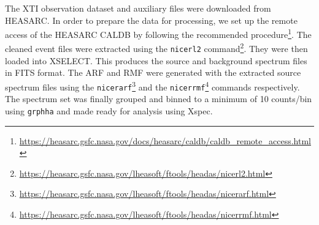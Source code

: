     	The XTI observation dataset and auxiliary files were downloaded from HEASARC. In order to prepare the data for processing, we set up the remote access of the HEASARC CALDB by following the recommended procedure\footnote{\url{https://heasarc.gsfc.nasa.gov/docs/heasarc/caldb/caldb_remote_access.html}}. The cleaned event files were extracted using the \texttt{nicerl2} command\footnote{\url{https://heasarc.gsfc.nasa.gov/lheasoft/ftools/headas/nicerl2.html}}. They were then loaded into XSELECT. This produces the source and background spectrum files in FITS format. The ARF and RMF were generated with the extracted source spectrum files using the \texttt{nicerarf}\footnote{\url{https://heasarc.gsfc.nasa.gov/lheasoft/ftools/headas/nicerarf.html}} and the \texttt{nicerrmf}\footnote{\url{https://heasarc.gsfc.nasa.gov/lheasoft/ftools/headas/nicerrmf.html}} commands respectively. The spectrum set was finally grouped and binned to a minimum of 10 counts/bin using \texttt{grphha} and made ready for analysis using Xspec.